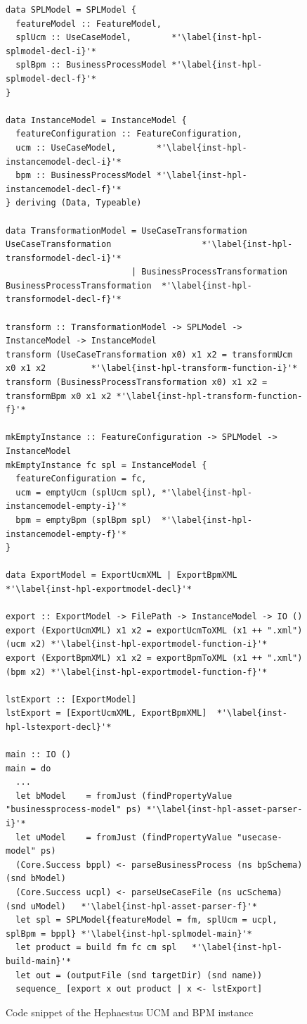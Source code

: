 \begin{figure}[t!]
\begin{lstlisting}
data SPLModel = SPLModel {
  featureModel :: FeatureModel,
  splUcm :: UseCaseModel,        *'\label{inst-hpl-splmodel-decl-i}'*
  splBpm :: BusinessProcessModel *'\label{inst-hpl-splmodel-decl-f}'* 
}

data InstanceModel = InstanceModel {
  featureConfiguration :: FeatureConfiguration,
  ucm :: UseCaseModel,        *'\label{inst-hpl-instancemodel-decl-i}'*
  bpm :: BusinessProcessModel *'\label{inst-hpl-instancemodel-decl-f}'* 
} deriving (Data, Typeable)

data TransformationModel = UseCaseTransformation UseCaseTransformation                  *'\label{inst-hpl-transformodel-decl-i}'*
                         | BusinessProcessTransformation BusinessProcessTransformation  *'\label{inst-hpl-transformodel-decl-f}'*

transform :: TransformationModel -> SPLModel -> InstanceModel -> InstanceModel
transform (UseCaseTransformation x0) x1 x2 = transformUcm x0 x1 x2         *'\label{inst-hpl-transform-function-i}'*
transform (BusinessProcessTransformation x0) x1 x2 = transformBpm x0 x1 x2 *'\label{inst-hpl-transform-function-f}'*

mkEmptyInstance :: FeatureConfiguration -> SPLModel -> InstanceModel
mkEmptyInstance fc spl = InstanceModel {
  featureConfiguration = fc,
  ucm = emptyUcm (splUcm spl), *'\label{inst-hpl-instancemodel-empty-i}'*
  bpm = emptyBpm (splBpm spl)  *'\label{inst-hpl-instancemodel-empty-f}'*
}

data ExportModel = ExportUcmXML | ExportBpmXML *'\label{inst-hpl-exportmodel-decl}'*

export :: ExportModel -> FilePath -> InstanceModel -> IO ()
export (ExportUcmXML) x1 x2 = exportUcmToXML (x1 ++ ".xml") (ucm x2) *'\label{inst-hpl-exportmodel-function-i}'*
export (ExportBpmXML) x1 x2 = exportBpmToXML (x1 ++ ".xml") (bpm x2) *'\label{inst-hpl-exportmodel-function-f}'*

lstExport :: [ExportModel]
lstExport = [ExportUcmXML, ExportBpmXML]  *'\label{inst-hpl-lstexport-decl}'*

main :: IO ()
main = do
  ...
  let bModel    = fromJust (findPropertyValue "businessprocess-model" ps) *'\label{inst-hpl-asset-parser-i}'*
  let uModel    = fromJust (findPropertyValue "usecase-model" ps)
  (Core.Success bppl) <- parseBusinessProcess (ns bpSchema) (snd bModel)
  (Core.Success ucpl) <- parseUseCaseFile (ns ucSchema) (snd uModel)   *'\label{inst-hpl-asset-parser-f}'*
  let spl = SPLModel{featureModel = fm, splUcm = ucpl, splBpm = bppl} *'\label{inst-hpl-splmodel-main}'*
  let product = build fm fc cm spl   *'\label{inst-hpl-build-main}'*
  let out = (outputFile (snd targetDir) (snd name))
  sequence_ [export x out product | x <- lstExport]
\end{lstlisting}
\caption{Code snippet of the Hephaestus UCM and BPM instance}
\label{fig:code-hp-ucm-bpm}
\end{figure}

